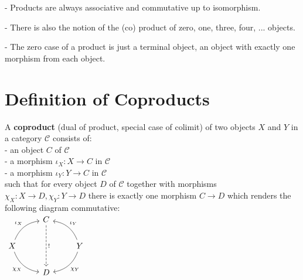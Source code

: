 \documentclass[a4paper, twoside, english, 11pt]{book}
\newcommand{\C}{\mathcal C}
\begin{document}
- Products are always associative and commutative up to isomorphism.

- There is also the notion of the (co) product of zero, one, three, four, ... objects.

- The zero case of a product is just a terminal object, an object with exactly one morphism from each object.



\section{Definition of Coproducts}

A \textbf{coproduct} (dual of product, special case of colimit) of two objects $X$ and $Y$ in a category $\C$ consists of: \\

- an object $C$ of $\C$ \\

- a morphism $\iota_X : X \rightarrow C$ in $\C$ \\

- a morphism $\iota_Y : Y \rightarrow C$ in $\C$ \\

\noindent
such that for every object $D$ of $\C$ together with morphisms $\chi_X : X \rightarrow D, \chi_Y : Y \rightarrow D$ there is exactly one morphism $C \rightarrow D$ which renders the following diagram commutative: \\

$\begin{tikzcd}
                                                                     & C \arrow[dd, "!", dashed] &                                                                      \\
X \arrow[ru, "\iota_X", bend left] \arrow[rd, "\chi_X"', bend right] &                           & Y \arrow[lu, "\iota_Y"', bend right] \arrow[ld, "\chi_Y", bend left] \\
                                                                     & D                         &
\end{tikzcd}$ \\
\end{document}
